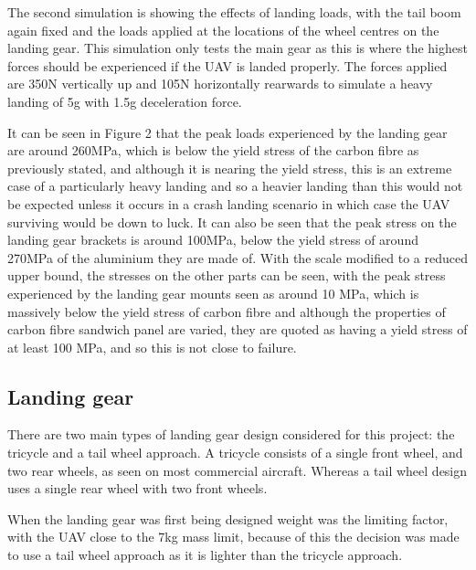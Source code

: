 \documentclass[../../main.tex]{subfiles}
\begin{document}
The second simulation is showing the effects of landing loads, with the tail boom again fixed and the loads applied at the locations of the wheel centres on the landing gear.
This simulation only tests the main gear as this is where the highest forces should be experienced if the UAV is landed properly.
The forces applied are 350N vertically up and 105N horizontally rearwards to simulate a heavy landing of 5g with 1.5g deceleration force. 


It can be seen in Figure 2 that the peak loads experienced by the landing gear are around 260MPa, which is below the yield stress of the carbon fibre as previously stated, and although it is nearing the yield stress, this is an extreme case of a particularly heavy landing and so a heavier landing than this would not be expected unless it occurs in a crash landing scenario in which case the UAV surviving would be down to luck.
It can also be seen that the peak stress on the landing gear brackets is around 100MPa, below the yield stress of around 270MPa of the aluminium they are made of.
With the scale modified to a reduced upper bound, the stresses on the other parts can be seen, with the peak stress experienced by the landing gear mounts seen as around 10 MPa, which is massively below the yield stress of carbon fibre and although the properties of carbon fibre sandwich panel are varied, they are quoted as having a yield stress of at least 100 MPa, and so this is not close to failure. 

\subsection{Landing gear} \label{sec:design-process:final-design-proposal:landing-gear}

There are two main types of landing gear design considered for this project: the tricycle and a tail wheel approach. A tricycle consists of a single front wheel, and two rear wheels, as seen on most commercial aircraft.
Whereas a tail wheel design uses a single rear wheel with two front wheels.


When the landing gear was first being designed  weight was the limiting factor, with the UAV close to the 7kg mass limit, because of this the decision was made to use a tail wheel approach as it is lighter than the tricycle approach.
\end{document}
